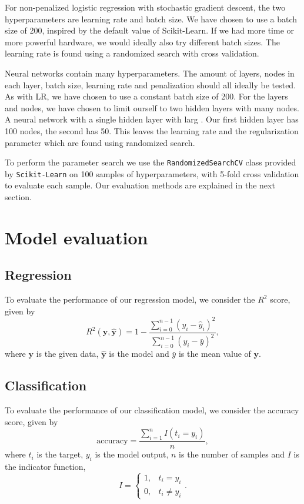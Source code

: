 \documentclass[a4paper, 11pt, twocolumn]{article}
\begin{document}
For non-penalized logistic regression with stochastic gradient descent,
the two hyperparameters are learning rate and batch size. We have chosen to use
a batch size of 200, inspired by the default value of Scikit-Learn. If we had
more time or more powerful hardware, we would ideally also try different batch sizes.
The learning rate is found using a randomized search with cross validation.

Neural networks contain many hyperparameters. The amount of layers, nodes in each
layer, batch size, learning rate and penalization should all ideally be tested.
As with LR, we have chosen to use a constant batch size of 200. For the layers
and nodes, we have chosen to limit ourself to two hidden layers with many nodes.
A neural network with a single hidden layer with larg \cite{ML_algo}. Our first hidden
layer has 100 nodes, the second has 50. This leaves the learning rate and
the regularization parameter which are found using randomized search.

To perform the parameter search we use the \texttt{RandomizedSearchCV} class provided
by \texttt{Scikit-Learn} \cite{sklearn_api} on 100 samples of hyperparameters,
with 5-fold cross validation to evaluate each sample. Our evaluation methods are
explained in the next section.

\section{Model evaluation}
\subsection{Regression}
To evaluate the performance of our regression model, we consider the $R^2$ score,
given by
\begin{equation}
	R^2(\bm{y}, \bm{\hat{y}}) = 1 - \frac{\sum_{i=0}^{n - 1} (y_i -
	\hat{y}_i)^2}{\sum_{i=0}^{n - 1} (y_i - \bar{y})^2},
    \label{eq:R2}
\end{equation}
where $\bm{y}$ is the given data, $\bm{\hat{y}}$ is the model and ${\bar{y}}$ is
the mean value of $\bm{y}$.
\subsection{Classification}
\label{Classification}
To evaluate the performance of our classification model, we consider the accuracy
score, given by
\begin{equation}
\label{eq:accuracy}
\text{accuracy}=\frac{\sum_{i=1}^nI(t_i=y_i)}{n},
\end{equation}
where $t_i$ is the target, $y_i$ is the model output, $n$ is the number of
samples and $I$ is the indicator function,
\[
I = \begin{cases}
1, & t_i = y_i\\
0, & t_i \neq y_i
\end{cases} .
\]
\end{document}
